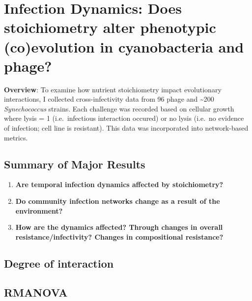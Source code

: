 \documentclass[]{article}
\providecommand{\tightlist}{%
  \setlength{\itemsep}{0pt}\setlength{\parskip}{0pt}}
\begin{document}
\newpage

\section{Infection Dynamics: Does stoichiometry alter phenotypic
(co)evolution in cyanobacteria and
phage?}\label{infection-dynamics-does-stoichiometry-alter-phenotypic-coevolution-in-cyanobacteria-and-phage}

\textbf{Overview}: To examine how nutrient stoichiometry impact
evolutionary interactions, I collected cross-infectivity data from 96
phage and \textasciitilde{}200 \emph{Synechococcus} strains. Each
challenge was recorded based on cellular growth where lysis = 1
(i.e.~infectious interaction occured) or no lysis (i.e.~no evidence of
infection; cell line is resistant). This data was incorporated into
network-based metrics.

\subsection{Summary of Major Results}\label{summary-of-major-results-2}

\begin{enumerate}
\def\labelenumi{\arabic{enumi}.}
\tightlist
\item
  \textbf{Are temporal infection dynamics affected by stoichiometry?}
\item
  \textbf{Do community infection networks change as a result of the
  environment?}
\item
  \textbf{How are the dynamics affected? Through changes in overall
  resistance/infectivity? Changes in compositional resistance?}
\end{enumerate}

\newpage

\subsection{Degree of interaction}\label{degree-of-interaction}

\subsection{RMANOVA}\label{rmanova}
\end{document}
